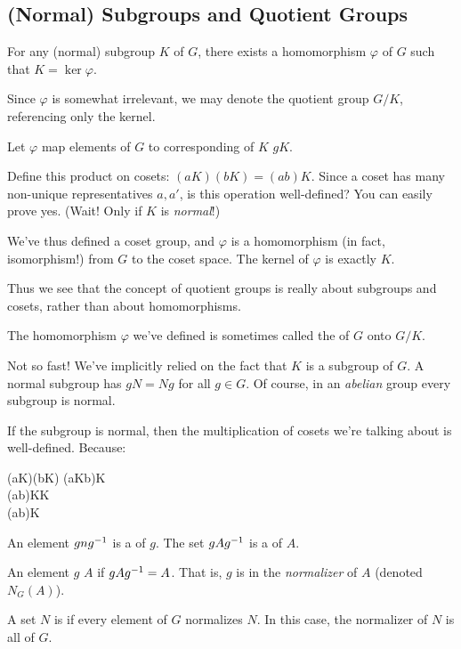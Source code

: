 \documentclass[11pt, oneside]{amsart}
\begin{document}
\subsection{(Normal) Subgroups and Quotient Groups}

\begin{theorem}
  For any (normal) subgroup $K$ of $G$, there exists a homomorphism
  $\varphi$ of $G$ such that $K = \ker\varphi$.

  Since $\varphi$ is somewhat irrelevant, we may denote the quotient
  group $G/K$, referencing only the kernel.
\end{theorem}

\begin{remark}
  Let $\varphi$ map elements of $G$ to corresponding  of
  $K$ $gK$.

  Define this product on cosets: $(aK)(bK) = (ab)K$. Since a
  coset has many non-unique representatives $a, a'$, is this operation
  well-defined? You can easily prove yes. (Wait! Only if $K$ is
  \emph{normal}!)

  We've thus defined a coset group, and $\varphi$ is a homomorphism (in
  fact, isomorphism!) from $G$ to the coset space. The kernel of
  $\varphi$ is exactly $K$.

  Thus we see that the concept of quotient groups is really about
  subgroups and cosets, rather than about homomorphisms.

  The homomorphism $\varphi$ we've defined is sometimes called the
   of $G$ onto $G/K$.
\end{remark}

\begin{remark}
  Not so fast! We've implicitly relied on the fact that $K$ is a
   subgroup of $G$. A normal subgroup has $gN = Ng$ for
  all $g \in G$. Of course, in an \emph{abelian} group every subgroup is
  normal.

  If the subgroup is normal, then the multiplication of cosets we're
  talking about is well-defined. Because:

  \begin{nedqn}
    (aK)(bK)
  \eqcol
    (aKb)K
  \\
  \eqcol
    (ab)KK
  \\
  \eqcol
    (ab)K
  \end{nedqn}
\end{remark}

\begin{definition}
  An element $gn{g}^{-1}$ is a  of $g$. The set
  $gA{g}^{-1}$ is a  of $A$.

  An element $g$  $A$ if $gA{g}^{-1} = A$. That is,
  $g$ is in the \emph{normalizer} of $A$ (denoted $N_G(A)$).

  A set $N$ is  if every element of $G$ normalizes $N$.
  In this case, the normalizer of $N$ is all of $G$.
\end{definition}
\end{document}
